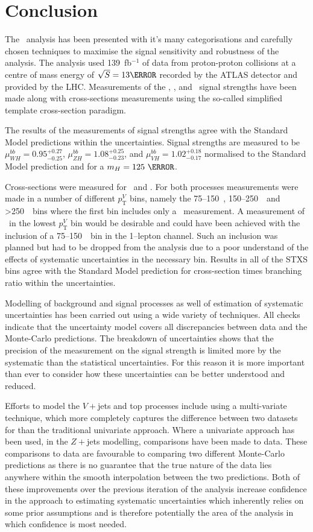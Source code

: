 \chapter{Conclusion}%
\label{ch:conclusion}
The \VHbb\ analysis has been presented with it's many categorisations and
carefully chosen techniques to maximise the signal sensitivity and robustness of
the analysis. The analysis used 139~fb$^{-1}$ of data from proton-proton
collisions at a centre of mass energy of $\sqrt{S} = 13 \TeV$ recorded by the
ATLAS detector and provided by the LHC. Measurements of the \WH, \ZH, and \VH\
signal strengths have been made along with cross-sections measurements using the
so-called simplified template cross-section paradigm.

The results of the measurements of signal strengths agree with the Standard
Model predictions within the uncertainties. Signal strengths are measured to be
$\mu_{W\!H}^{bb} = 0.95^{+0.27}_{-0.25}$, $\mu_{Z\!H}^{bb} =
1.08^{+0.25}_{-0.23}$, and $\mu_{V\!H}^{bb} = 1.02^{+0.18}_{-0.17}$ normalised
to the Standard Model prediction and for a $m_H = 125~\GeV$.

Cross-sections were measured for \WH\ and \ZH. For both processes measurements
were made in a number of different $p_{\mathrm{T}}^{V}$ bins, namely the
75--150~\GeV, 150--250~\GeV\ and >250~\GeV\ bins where the first bin includes
only a \ZH\ measurement. A measurement of \WH\ in the lowest
$p_{\mathrm{T}}^{V}$ bin would be desirable and could have been achieved with
the inclusion of a 75--150~\GeV\ bin in the 1--lepton channel. Such an inclusion
was planned but had to be dropped from the analysis due to a poor understand of
the effects of systematic uncertainties in the necessary bin. Results in all of
the STXS bins agree with the Standard Model prediction for cross-section times
branching ratio within the uncertainties.

Modelling of background and signal processes as well of estimation of systematic
uncertainties has been carried out using a wide variety of techniques. All
checks indicate that the uncertainty model covers all discrepancies between data
and the Monte-Carlo predictions. The breakdown of uncertainties shows that the
precision of the measurement on the signal strength is limited more by the
systematic than the statistical uncertainties. For this reason it is more
important than ever to consider how these uncertainties can be better understood
and reduced. 

Efforts to model the $V+$jets and top processes include using a multi-variate
technique, which more completely captures the difference between two datasets
for than the traditional univariate approach. Where a univariate approach has
been used, in the $Z+$jets modelling, comparisons have been made to data. These
comparisons to data are favourable to comparing two different Monte-Carlo
predictions as there is no guarantee that the true nature of the data lies
anywhere within the smooth interpolation between the two predictions. Both of
these improvements over the previous iteration of the analysis increase
confidence in the approach to estimating systematic uncertainties which
inherently relies on some prior assumptions and is therefore potentially the
area of the analysis in which confidence is most needed.

